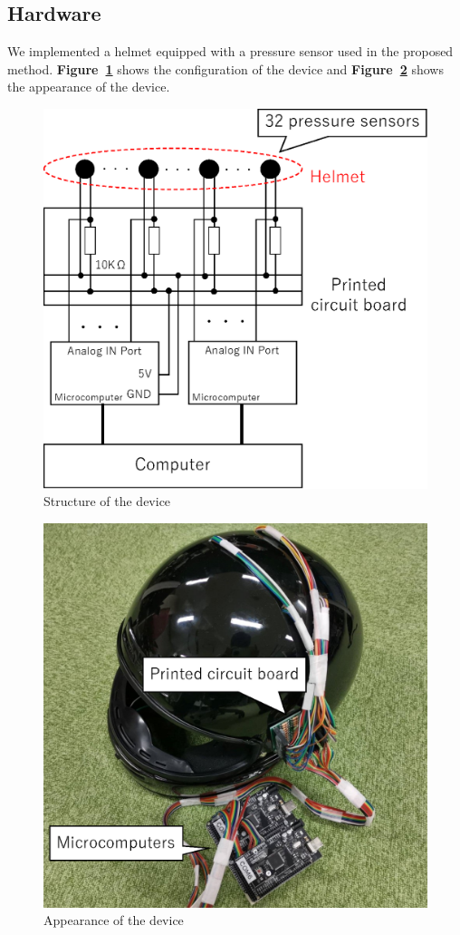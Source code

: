 \documentclass[sigchi,authordraft]{acmart}
\newcommand\figref[1]{\textbf{Figure~\ref{fig:#1}}}
\begin{document}
\subsection{Hardware}
We implemented a helmet equipped with a pressure sensor used in the proposed method. \figref{device} shows the configuration of the device and \figref{met_over} shows the appearance of the device.\par


\begin{figure}[!t]
  \begin{center}
    \includegraphics[width=0.65\linewidth]{figure/device.eps}
  \end{center}
  \caption{Structure of the device}
  \label{fig:device}
\end{figure}

\begin{figure}[!t]
  \begin{center}
    \includegraphics[width=0.6\linewidth]{figure/met_over.eps}
  \end{center}
  \caption{Appearance of the device}
  \label{fig:met_over}
\end{figure}
\end{document}
